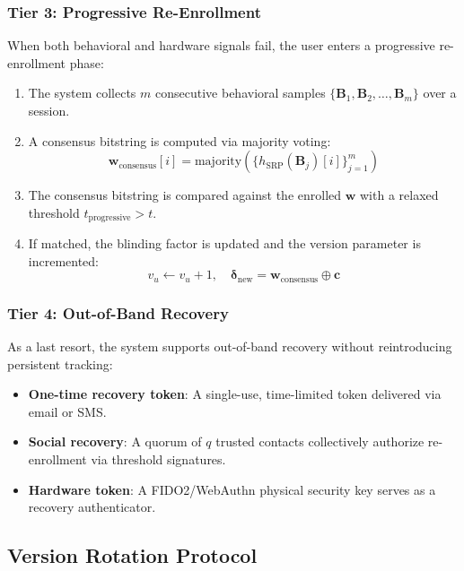 \documentclass[11pt,twoside]{amsart}
\theoremstyle{plain}
\theoremstyle{definition}
\theoremstyle{remark}
\newcommand{\bB}{\mathbf{B}}
\newcommand{\bw}{\mathbf{w}}
\newcommand{\bc}{\mathbf{c}}
\newcommand{\bdelta}{\boldsymbol{\delta}}
\begin{document}
\subsubsection{Tier 3: Progressive Re-Enrollment}

When both behavioral and hardware signals fail, the user enters a progressive re-enrollment phase:
\begin{enumerate}
    \item The system collects $m$ consecutive behavioral samples $\{\bB_1, \bB_2, \ldots, \bB_m\}$ over a session.
    \item A consensus bitstring is computed via majority voting:
    \begin{equation}
    \bw_{\text{consensus}}[i] = \text{majority}\left(\{h_{\text{SRP}}(\bB_j)[i]\}_{j=1}^{m}\right)
    \end{equation}
    \item The consensus bitstring is compared against the enrolled $\bw$ with a relaxed threshold $t_{\text{progressive}} > t$.
    \item If matched, the blinding factor is updated and the version parameter is incremented:
    \begin{equation}
    v_u \leftarrow v_u + 1, \quad \bdelta_{\text{new}} = \bw_{\text{consensus}} \oplus \bc
    \end{equation}
\end{enumerate}

\subsubsection{Tier 4: Out-of-Band Recovery}

As a last resort, the system supports out-of-band recovery without reintroducing persistent tracking:
\begin{itemize}
    \item \textbf{One-time recovery token}: A single-use, time-limited token delivered via email or SMS.
    \item \textbf{Social recovery}: A quorum of $q$ trusted contacts collectively authorize re-enrollment via threshold signatures.
    \item \textbf{Hardware token}: A FIDO2/WebAuthn physical security key serves as a recovery authenticator.
\end{itemize}

\subsection{Version Rotation Protocol}
\end{document}
